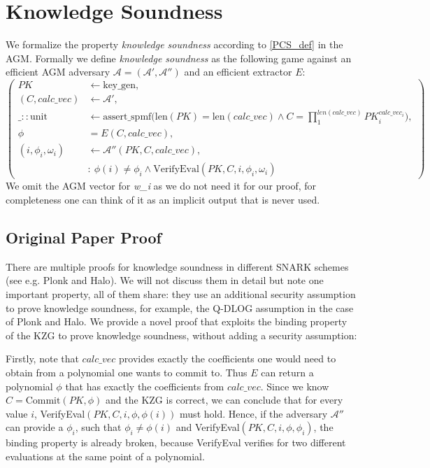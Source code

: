 \section{Knowledge Soundness}
\label{security:knowledgesound}
We formalize the property \textit{knowledge soundness} according to \ref{PCS_def} in the AGM. Formally we define \textit{knowledge soundness} as the following game against an efficient AGM adversary $\mathcal{A=(A',A'')}$ and an efficient extractor $E$: 
\begin{equation*}
    \left(
        \begin{aligned}
            PK &\leftarrow \text{key\_gen}, \\
            (C,calc\_vec) &\leftarrow \mathcal{A'}, \\
            \_::\text{unit} &\leftarrow \text{assert\_spmf}\biggl(\text{len}(PK)=\text{len}(calc\_vec) \land C = \prod_{1}^{len(calc\_vec)}PK_i^{calc\_vec_i}\biggr), \\
            \phi &= E(C, calc\_vec),\\
            (i, \phi_i, \omega_i) &\leftarrow \mathcal{A''}(PK, C, calc\_vec), \\
            & : \ \phi(i) \ne \phi_i \land \text{VerifyEval}(PK,C,i,\phi_i,\omega_i)
        \end{aligned}
        \right)
\end{equation*}
We omit the AGM vector for \textit{w\_i} as we do not need it for our proof, for completeness one can think of it as an implicit output that is never used.

\subsection*{Original Paper Proof}
\label{security:knowledge:paper}
There are multiple proofs for knowledge soundness in different SNARK schemes (see e.g. Plonk\parencite{plonk} and Halo\parencite{halo}). We will not discuss them in detail but note one important property, all of them share: they use an additional security assumption to prove knowledge soundness, for example, the Q-DLOG assumption in the case of Plonk and Halo. We provide a novel proof that exploits the binding property of the KZG to prove knowledge soundness, without adding a security assumption: 

Firstly, note that $calc\_vec$ provides exactly the coefficients one would need to obtain from a polynomial one wants to commit to. Thus $E$ can return a polynomial $\phi$ that has exactly the coefficients from $calc\_vec$. Since we know $C= \text{Commit}(PK, \phi)$ and the KZG is correct, we can conclude that for every value $i$, VerifyEval$(PK, C, i, \phi, \phi(i))$ must hold. Hence, if the adversary $\mathcal{A''}$ can provide a $\phi_i$, such that $\phi_i\ne\phi(i)$
and VerifyEval$(PK, C, i, \phi, \phi_i)$, the binding property is already broken, because VerifyEval verifies for two different evaluations at the same point of a polynomial.

